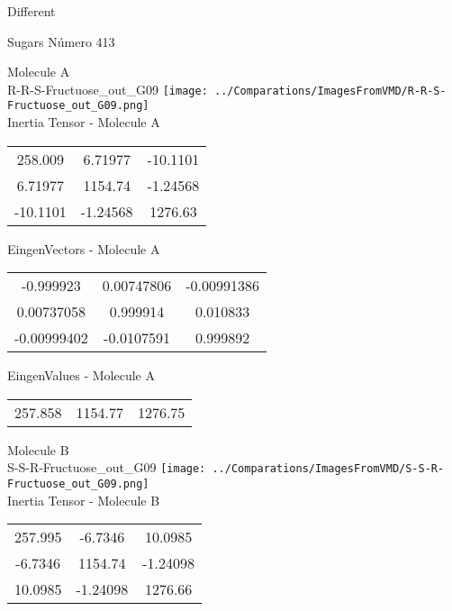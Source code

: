 \begin{center}
\vtab
\vtab
\textcolor{NavyBlue}{\Large Different}
\end{center}

 \newpage

\vtab[-2cm]
\begin{center}
{\large Sugars \tab Número 413}
\end{center}
\begin{multicols}{2}
\begin{center}

Molecule A \\ 
R-R-S-Fructuose\_out\_G09
\texttt{[image: ../Comparations/ImagesFromVMD/R-R-S-Fructuose\_out\_G09.png]}
\\
Inertia Tensor - Molecule A \\
\vtab

\begin{tabular}{|c c c|}
258.009	 & 	6.71977	 & 	-10.1101	 \\
6.71977	 & 	1154.74	 & 	-1.24568	 \\
-10.1101	 & 	-1.24568	 & 	1276.63
\end{tabular}

\vtab
 EingenVectors - Molecule A     \\
\vtab
\begin{tabular}{|c c c|}
-0.999923	 & 	0.00747806	 & 	-0.00991386	 \\
0.00737058	 & 	0.999914	 & 	0.010833	 \\
-0.00999402	 & 	-0.0107591	 & 	0.999892
\end{tabular}

\vtab
 EingenValues - Molecule A     \\
\vtab
\begin{tabular}{|c c c|}
257.858	 & 	1154.77	 & 	1276.75	 \\
\end{tabular}
\columnbreak

Molecule B \\ 
S-S-R-Fructuose\_out\_G09
\texttt{[image: ../Comparations/ImagesFromVMD/S-S-R-Fructuose\_out\_G09.png]}
\\
Inertia Tensor - Molecule B \\
\vtab

\begin{tabular}{|c c c|}
257.995	 & 	-6.7346	 & 	10.0985	 \\
-6.7346	 & 	1154.74	 & 	-1.24098	 \\
10.0985	 & 	-1.24098	 & 	1276.66
\end{tabular}


\end{center}
\end{multicols}
